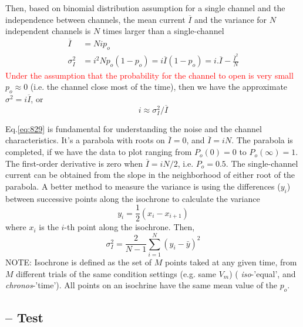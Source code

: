 Then, based on binomial distribution assumption for a single channel and the
independence between channels, the mean current $\overline{I}$ and the variance
for $N$ independent channels is $N$ times larger than a single-channel
\begin{equation}
  \label{eq:829}
\begin{split}
  \overline{I} &= Nip_o \\
  \sigma_I^2 &= i^2Np_o(1-p_o) = i\overline{I}(1-p_o) = i.\overline{I} -
  \frac{\overline{I}^2}{N}
\end{split}
\end{equation}
\textcolor{red}{Under the assumption that the probability for the
  channel to open is very small} $p_o\approx 0$
(i.e. the channel close most of the time), then we have the
approximate $\sigma^2=i\overline{I}$, or
\begin{equation}
  \label{eq:830}
  i \approx \sigma_I^2/\overline{I}
\end{equation}

Eq.\ref{eq:829} is fundamental for understanding the noise and the channel
characteristics. It's a parabola with roots on $\overline{I}=0$, and
$\overline{I}=iN$. The parabola is completed, if we have the data to plot
ranging from $P_o(0)=0$ to $P_o(\infty)=1$. The first-order derivative is zero
when $\overline{I}=iN/2$, i.e. $P_o=0.5$. The single-channel current can be
obtained from the slope in the neighborhood of either root of the parabola. A
better method to measure the variance is using the differences ($y_i$) between
successive points along the isochrone to calculate the variance
\begin{equation}
y_i = \frac{1}{2}(x_i - x_{i+1})
\end{equation}
where $x_i$ is the $i$-th point along the isochrone. Then,
\begin{equation}
\sigma_I^2 = \frac{2}{N-1}\sum_{i=1}^N(y_i-\bar{y})^2
\end{equation}
NOTE: Isochrone is defined as the set of $M$ points taked at any given time,
from $M$ different trials of the same condition settings (e.g. same $V_m$) ({\it
iso}-'equal', and {\it chronos}-'time'). All points on an isochrine have the same mean value of the
$p_o$.


%
\subsection{-- Test}


